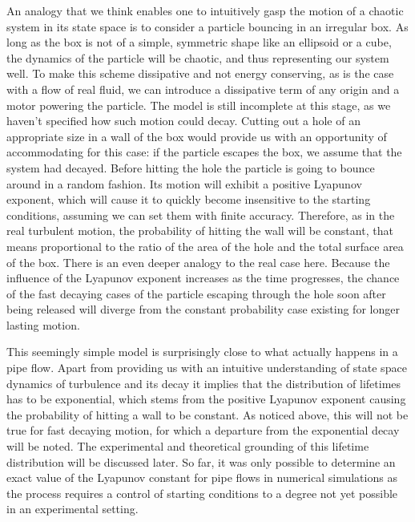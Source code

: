 \documentclass[11pt,a4paper]{article}
\begin{document}
An analogy that we think enables one to intuitively gasp the motion of a chaotic system in its state space is to consider a particle bouncing in an irregular box\cite{Ott93}.
As long as the box is not of a simple, symmetric shape like an ellipsoid or a cube, the dynamics of the particle will be chaotic, and thus representing our system well\cite{Ott93}.
To make this scheme dissipative and not energy conserving, as is the case with a flow of real fluid, we can introduce a dissipative term of any origin and a motor powering the particle.
The model is still incomplete at this stage, as we haven't specified how such motion could decay.
Cutting out a hole of an appropriate size in a wall of the box would provide us with an opportunity of accommodating for this case: if the particle escapes the box, we assume that the system had decayed.
Before hitting the hole the particle is going to bounce around in a random fashion.
Its motion will exhibit a positive Lyapunov exponent, which will cause it to quickly become insensitive to the starting conditions, assuming we can set them with finite accuracy.
Therefore, as in the real turbulent motion, the probability of hitting the wall will be constant, that means proportional to the ratio of the area of the hole and the total surface area of the box.
There is an even deeper analogy to the real case here.
Because the influence of the Lyapunov exponent increases as the time progresses, the chance of the fast decaying cases of the particle escaping through the hole soon after being released will diverge from the constant probability case existing for longer lasting motion.

This seemingly simple model is surprisingly close to what actually happens in a pipe flow.
Apart from providing us with an intuitive understanding of state space dynamics of turbulence and its decay it implies that the distribution of lifetimes has to be exponential, which stems from the positive Lyapunov exponent causing the probability of hitting a wall to be constant.
As noticed above, this will not be true for fast decaying motion, for which a departure from the exponential decay will be noted.
The experimental and theoretical grounding of this lifetime distribution will be discussed later.
So far, it was only possible to determine an exact value of the Lyapunov constant for pipe flows in numerical simulations\cite{Faisst04} as the process requires a control of starting conditions to a degree not yet possible in an experimental setting.
\end{document}
